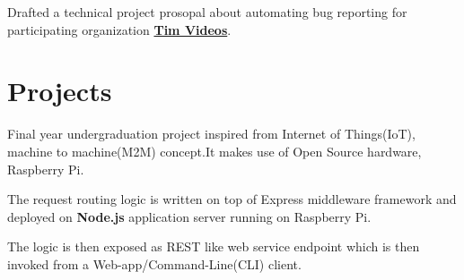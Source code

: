 \documentclass[]{deedy-resume-openfont}
\begin{document}
\begin{minipage}[t]{0.66\textwidth}
\begin{tightemize}
\item Drafted a technical project prosopal about automating bug reporting
  for participating organization \href{http://code.timvideos.us/home/}{\textbf{Tim Videos}}.
\end{tightemize}
\sectionsep


\section{Projects}
\descript{}
\begin{tightemize}
\item Final year undergraduation project inspired from Internet of Things(IoT), machine to machine(M2M)
  concept.It makes use of Open Source hardware, Raspberry Pi.
\item The request routing logic is written on top of Express middleware
  framework and deployed on \textbf{Node.js }application server running on
  Raspberry Pi.
\item The logic is then exposed as REST like web service endpoint which is then
  invoked from a Web-app/Command-Line(CLI) client.
\end{tightemize}
\sectionsep


\end{minipage}
\end{document}

